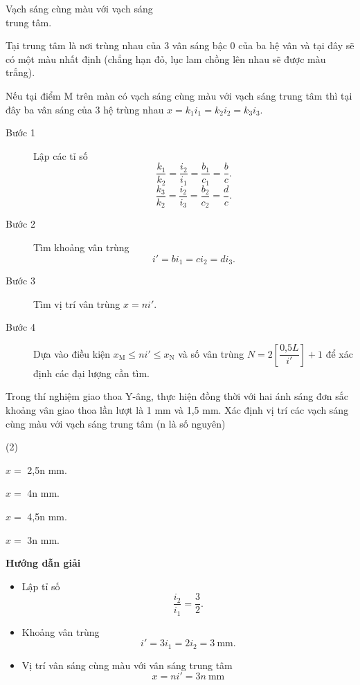 \begin{dang}{Vạch sáng cùng màu với vạch sáng\\ trung tâm.}
{		Tại trung tâm là nơi trùng nhau của 3 vân sáng bậc 0 của ba hệ vân và tại đây sẽ có một màu nhất định (chẳng hạn đỏ, lục lam chồng lên nhau sẽ được màu trắng).
		
		Nếu tại điểm M trên màn có vạch sáng cùng màu với vạch sáng trung tâm thì tại đây ba vân sáng của 3 hệ trùng nhau $x=k_1i_1=k_2i_2=k_3i_3.$
		
		
		\begin{description}
			\item [Bước 1] Lập các tỉ số
			\begin{equation*}
				\dfrac{k_1}{k_2}=\dfrac{i_2}{i_1}=\dfrac{b_1}{c_1}=\dfrac{b}{c}.
			\end{equation*}
			\begin{equation*}
				\dfrac{k_3}{k_2}=\dfrac{i_2}{i_3}=\dfrac{b_2}{c_2}=\dfrac{d}{c}.
			\end{equation*}
			\item [Bước 2] Tìm khoảng vân trùng 
			\begin{equation*}
				i'=bi_1=ci_2 =di_3.
			\end{equation*}	
			\item [Bước 3] Tìm vị trí vân trùng $x = n i'$.
			\item [Bước 4]Dựa vào điều kiện $x_{\text{M}} \leq ni' \leq x_{\text{N}}$ và số vân trùng $N=2\left[\dfrac{\text{0,5} L}{i'}\right] +1$ để xác định các đại lượng cần tìm.
		\end{description}
	}
	
	{Trong thí nghiệm giao thoa Y-âng, thực hiện đồng thời với hai ánh sáng đơn sắc khoảng vân giao thoa lần lượt là 1 mm và 1,5 mm. Xác định vị trí các vạch sáng cùng màu với vạch sáng trung tâm (n là số nguyên)
		\begin{mcq}(2)
			\item $x =$ 2,5n mm. 	
			\item $x =$ 4n mm.   	  
			\item $x =$ 4,5n mm.          
			\item $x =$ 3n mm. 
		\end{mcq}
	}
	{\begin{center}
			\textbf{Hướng dẫn giải}
		\end{center}
		
		\begin{itemize}
			\item Lập tỉ số
			\begin{equation*}
				\dfrac{i_2}{i_1}=\dfrac{3}{2}.
			\end{equation*}
			\item Khoảng vân trùng
			\begin{equation*}
				i'=3i_1=2i_2= 3\ \text{mm}.
			\end{equation*}
			\item Vị trí vân sáng cùng màu với vân sáng trung tâm
			\begin{equation*}
				x=ni'=3n\ \text{mm}
			\end{equation*}
		\end{itemize}
		
}
\end{dang}
